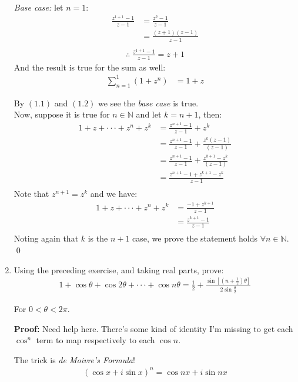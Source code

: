 \begin{enumerate}
	\emph{Base case:} let $n = 1$:
	\begin{align*}
		\frac{z^{1 + 1} - 1}{z -1} &= \frac{z^2 - 1}{z - 1} \\
		&= \frac{(z + 1)(z - 1)}{z - 1} \\
	\end{align*}
	\begin{align}
		\therefore \; \frac{z^{1 + 1} - 1}{z -1} = z + 1
	\end{align}
	And the result is true for the sum as well:
	\begin{align}
		\sum_{n = 1}^{1} (1 + z^n) &= 1 + z
	\end{align}

	By $(1.1)$ and $(1.2)$ we see the \emph{base case} is true.
	\\
	Now, suppose it is true for $n \in \mathbb{N}$ and let $k = n + 1$, then:
	\begin{align*}
		1 + z + \cdot\cdot\cdot + z^n + z^k &= \frac{z^{n + 1} - 1}{z - 1} + z^k \\
		&= \frac{z^{n + 1} - 1}{z - 1} + \frac{z^k(z - 1)}{(z - 1)} \\
		&= \frac{z^{n + 1} - 1}{z - 1} + \frac{z^{k + 1} - z^k}{(z - 1)} \\
		&= \frac{z^{n + 1} - 1 + z^{k + 1} - z^k}{z - 1} \\ 
	\end{align*}
	Note that $z^{n + 1} = z^k$ and we have:
	\begin{align*}
		1 + z + \cdot\cdot\cdot + z^n + z^k &= \frac{ - 1 + z^{k + 1}}{z - 1} \\
		&= \frac{z^{k + 1} - 1}{z - 1} \\
	\end{align*}
	Noting again that $k$ is the $n + 1$ case, we prove the statement holds $\forall n \in \mathbb{N}.$
	\qed 

	\item Using the preceding exercise, and taking real parts, prove:
	\begin{align*}
		1 + \cos\theta + \cos2\theta + \cdot\cdot\cdot + \cos n\theta = \frac{1}{2} + \frac{\sin[(n + \frac{1}{2})\theta]}{2\sin{\frac{\theta}{2}}}
	\end{align*}

	For $0 < \theta < 2\pi.$

	\textbf{Proof:}
	Need help here. There's some kind of identity I'm missing to get each $\cos^n$ term to map respectively to each $\cos n.$

	The trick is \emph{de Moivre's Formula}!
	\begin{align*}
		\left( \cos x + i \sin x \right)^n = \cos nx + i \sin nx \\
	\end{align*}


\end{enumerate}
